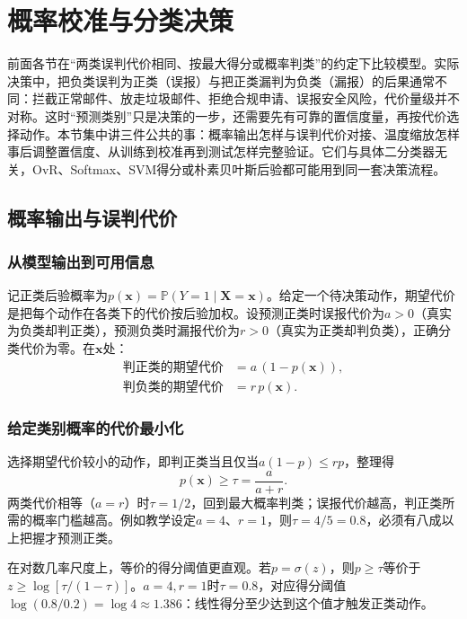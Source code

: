 \section{概率校准与分类决策}
\label{sec:classification-calibration}

前面各节在“两类误判代价相同、按最大得分或概率判类”的约定下比较模型。实际决策中，把负类误判为正类（误报）与把正类漏判为负类（漏报）的后果通常不同：拦截正常邮件、放走垃圾邮件、拒绝合规申请、误报安全风险，代价量级并不对称。这时“预测类别”只是决策的一步，还需要先有可靠的置信度量，再按代价选择动作。本节集中讲三件公共的事：概率输出怎样与误判代价对接、温度缩放怎样事后调整置信度、从训练到校准再到测试怎样完整验证。它们与具体二分类器无关，OvR、Softmax、SVM得分或朴素贝叶斯后验都可能用到同一套决策流程。

\subsection{概率输出与误判代价}
\label{sec:classification-cost-decision}

\subsubsection{从模型输出到可用信息}
记正类后验概率为$p(\bm x)=\mathbb P(Y=1\mid\bm X=\bm x)$。给定一个待决策动作，期望代价是把每个动作在各类下的代价按后验加权。设预测正类时误报代价为$a>0$（真实为负类却判正类），预测负类时漏报代价为$r>0$（真实为正类却判负类），正确分类代价为零。在$\bm x$处：
\[
\begin{aligned}
\text{判正类的期望代价}
  &=a\,(1-p(\bm x)),\\
\text{判负类的期望代价}
  &=r\,p(\bm x).
\end{aligned}
\]

\subsubsection{给定类别概率的代价最小化}
选择期望代价较小的动作，即判正类当且仅当$a(1-p)\leq rp$，整理得
\begin{equation}
  p(\bm x)\geq \tau=\frac{a}{a+r}.
  \label{eq:classification-cost-threshold}
\end{equation}
两类代价相等（$a=r$）时$\tau=1/2$，回到最大概率判类；误报代价越高，判正类所需的概率门槛越高。例如教学设定$a=4$、$r=1$，则$\tau=4/5=0.8$，必须有八成以上把握才预测正类。

在对数几率尺度上，等价的得分阈值更直观。若$p=\sigma(z)$，则$p\geq\tau$等价于$z\geq\log[\tau/(1-\tau)]$。$a=4,r=1$时$\tau=0.8$，对应得分阈值$\log(0.8/0.2)=\log4\approx1.386$：线性得分至少达到这个值才触发正类动作。


